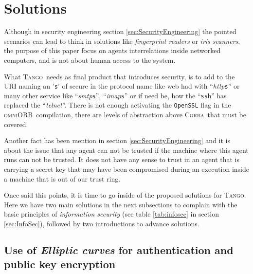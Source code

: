 \documentclass[10pt,a4paper,twoside]{llncs}
\newcommand{\tango}{\textsc{Tango}}
\newcommand{\corba}{\textsc{Corba}}
\newcommand{\omniorb}{\textsc{omniORB}}
\begin{document}
\section{Solutions}\label{sec:solutions}

Although in security engineering section \ref{sec:SecurityEngineering} the pointed scenarios can lead to think in solutions like \emph{fingerprint readers} or \emph{iris scanners}, the purpose of this paper focus on agents interrelations inside networked computers, and is not about human access to the system.

What \tango\, needs as final product that introduces security, is to add to the URI naming an '{\tt s}' of secure in the protocol name like web had with ``\emph{http}{\tt s}'' or many other service like ``\emph{smtp}{\tt s}'', ``\emph{imap}{\tt s}'' or if need be, how the ``{\tt ssh}'' has replaced the ``\emph{telnet}''. There is not enough activating the {\tt OpenSSL} flag in the \omniorb\, compilation, there are levels of abstraction above \corba\, that must be covered.

Another fact has been mention in section \ref{sec:SecurityEngineering} and it is about the issue that any agent can not be trusted if the machine where this agent runs can not be trusted. It does not have any sense to trust in an agent that is carrying a secret key that may have been compromised during an execution inside a machine that is out of our trust ring.

Once said this points, it is time to go inside of the proposed solutions for \tango. Here we have two main solutions in the next subsections to complain with the basic principles of \emph{information security} (see table \ref{tab:infosec} in section \ref{sec:InfoSec}), followed by two introductions to advance solutions.

\subsection{Use of \emph{Elliptic curves} for authentication and public key encryption}\label{sec:authentication}
\end{document}

